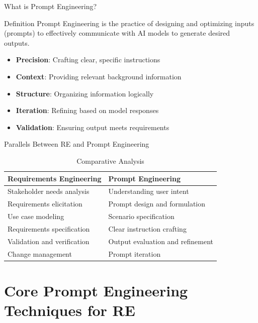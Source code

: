 \documentclass{beamer}
\begin{document}
\begin{frame}[t]{What is Prompt Engineering?}
    \begin{block}{Definition}
        Prompt Engineering is the practice of designing and optimizing inputs (prompts) to effectively communicate with AI models to generate desired outputs.
    \end{block}
    
    \begin{itemize}
        \item \textbf{Precision}: Crafting clear, specific instructions
        \item \textbf{Context}: Providing relevant background information
        \item \textbf{Structure}: Organizing information logically
        \item \textbf{Iteration}: Refining based on model responses
        \item \textbf{Validation}: Ensuring output meets requirements
    \end{itemize}
\end{frame}

\begin{frame}[t]{Parallels Between RE and Prompt Engineering}
    \begin{table}
        \centering
        \begin{tabular}{p{}|p{}}
            \textbf{Requirements Engineering} & \textbf{Prompt Engineering} \\
            \hline
            Stakeholder needs analysis & Understanding user intent \\
            Requirements elicitation & Prompt design and formulation \\
            Use case modeling & Scenario specification \\
            Requirements specification & Clear instruction crafting \\
            Validation and verification & Output evaluation and refinement \\
            Change management & Prompt iteration \\
        \end{tabular}
        \caption{Comparative Analysis}
    \end{table}
\end{frame}

\section{Core Prompt Engineering Techniques for RE}
\end{document}
